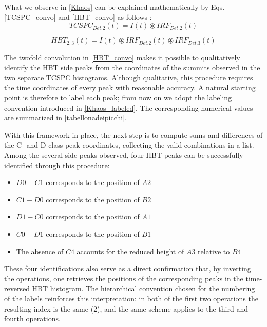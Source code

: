 What we observe in \autoref{Khaos} can be explained mathematically by Eqs.~ \ref{TCSPC_convo} and \ref{HBT_convo} as follows :
\begin{equation}
TCSPC_{Det.2}(t) = I(t) \circledast IRF_{Det.2}(t)
\label{TCSPC_convo}
\end{equation}

\begin{equation}
HBT_{2,3}(t) = I(t) \circledast IRF_{Det.2}(t) \circledast IRF_{Det.3}(t)
\label{HBT_convo}
\end{equation}

The twofold convolution in \autoref{HBT_convo} makes it possible to qualitatively identify the HBT side peaks from the coordinates of the summits observed in the two separate TCSPC histograms.
Although qualitative, this procedure requires the time coordinates of every peak with reasonable accuracy.
A natural starting point is therefore to label each peak; from now on we adopt the labeling convention introduced in \autoref{Khaos_labeled}.
The corresponding numerical values are summarized in \autoref{tabellonadeipicchi}.

With this framework in place, the next step is to compute sums and differences of the C- and D-class peak coordinates, collecting the valid combinations in a list.
Among the several side peaks observed, four HBT peaks can be successfully identified through this procedure:
\begin{itemize}
\item $D0 - C1$ corresponds to the position of $A2$
\item $C1 - D0$ corresponds to the position of $B2$
\item $D1 - C0$ corresponds to the position of $A1$
\item $C0 - D1$ corresponds to the position of $B1$
\item The absence of $C4$ accounts for the reduced height of $A3$ relative to $B4$
\end{itemize}
These four identifications also serve as a direct confirmation that, by inverting the operations, one retrieves the positions of the corresponding peaks in the time-reversed HBT histogram. The hierarchical convention chosen for the numbering of the labels reinforces this interpretation: in both of the first two operations the resulting index is the same (2), and the same scheme applies to the third and fourth operations.



